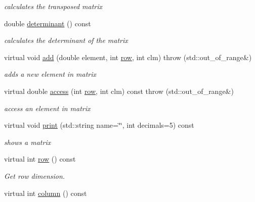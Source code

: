 \begin{DoxyCompactItemize}
\begin{DoxyCompactList}\small\item\em calculates the transposed matrix \end{DoxyCompactList}\item 
double \hyperlink{classavr_matrix_a778cdf2fd6644178cc0d43a6c9ff439c}{determinant} () const 
\begin{DoxyCompactList}\small\item\em calculates the determinant of the matrix \end{DoxyCompactList}\item 
virtual void \hyperlink{classavr_matrix_a242c461dc5189ba5ea51d7de92b50eea}{add} (double element, int \hyperlink{classavr_matrix_a3e27175e91c4565f66ec6e590fc86520}{row}, int clm)  throw (std\-::out\-\_\-of\-\_\-range\&)
\begin{DoxyCompactList}\small\item\em adds a new element in matrix \end{DoxyCompactList}\item 
virtual double \hyperlink{classavr_matrix_a24e5e23cfcba9774ce4a10d8a027b622}{access} (int \hyperlink{classavr_matrix_a3e27175e91c4565f66ec6e590fc86520}{row}, int clm) const   throw (std\-::out\-\_\-of\-\_\-range\&)
\begin{DoxyCompactList}\small\item\em access an element in matrix \end{DoxyCompactList}\item 
virtual void \hyperlink{classavr_matrix_a28dd43731f25153dff0a121004f23d34}{print} (std\-::string name=\char`\"{}\char`\"{}, int decimals=5) const 
\begin{DoxyCompactList}\small\item\em shows a matrix \end{DoxyCompactList}\item 
\hypertarget{classavr_matrix_a3e27175e91c4565f66ec6e590fc86520}{virtual int \hyperlink{classavr_matrix_a3e27175e91c4565f66ec6e590fc86520}{row} () const }\label{classavr_matrix_a3e27175e91c4565f66ec6e590fc86520}

\begin{DoxyCompactList}\small\item\em Get row dimension. \end{DoxyCompactList}\item 
\hypertarget{classavr_matrix_a87a5d5fee3d3f8ff1970d077eee52ce5}{virtual int \hyperlink{classavr_matrix_a87a5d5fee3d3f8ff1970d077eee52ce5}{column} () const }\label{classavr_matrix_a87a5d5fee3d3f8ff1970d077eee52ce5}


\end{DoxyCompactItemize}
